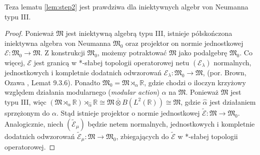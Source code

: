 \begin{Lemma}
Teza lematu \ref{lem:step2} jest prawdziwa dla iniektywnych algebr von Neumanna
typu III.
\end{Lemma}
\begin{proof}
Ponieważ $\mathfrak{M}$ jest iniektywną algebrą typu III,
istnieje półskończona iniektywna algebra von Neumanna
$\mathfrak{M}_{0}$ oraz projektor on normie jednostkowej
$\mathcal{E}: \mathfrak{M}_{0} \rightarrow \mathfrak{M}$.
Z konstrukcji $\mathfrak{M}_{0}$, możemy potraktować
$\mathfrak{M}$ jako podalgebrę $\mathfrak{M}_{0}$.
Co więcej, $\mathcal{E}$ jest granicą w *-słabej topologii operatorowej
netu $(\mathcal{E}_{\lambda})$ normalnych, jednostkowych i kompletnie dodatnich
odwzorowań $\mathcal{E}_{\lambda} : \mathfrak{M}_{0} \rightarrow \mathfrak{M}$,
(por. Brown, Ozawa \cite{Brown2008}, Lemat 9.3.6).
Ponadto
$\mathfrak{M}_{0} = \mathfrak{M} \rtimes_{\alpha} \mathbb{R}$,
gdzie chodzi o iloczyn krzyżowy względem działania modularnego
(\emph{modular action}) $\alpha$ na $\mathfrak{M}$.
Ponieważ $\mathfrak{M}$ jest typu III, więc
$(\mathfrak{M} \rtimes_{\alpha} \mathbb{R}) \rtimes_{\hat{\alpha}} \mathbb{R}
\cong \mathfrak{M} \bar{\otimes} B(L^{2}(\mathbb{R})) \cong \mathfrak{M}$,
gdzie $\hat{\alpha}$ jest działaniem sprzężonym do $\alpha$.
Stąd istnieje projektor o normie jednostkowej
$\tilde{\mathcal{E}} : \mathfrak{M} \rightarrow \mathfrak{M}_{0}$.
Analogicznie, niech $(\tilde{\mathcal{E}}_{\mu})$
będzie netem normalnych, jednostkowych i kompletnie dodatnich odwzorowań
$\tilde{\mathcal{E}}_{\mu}: \mathfrak{M} \rightarrow \mathfrak{M}_{0}$,
zbiegających do $\tilde{\mathcal{E}}$ w *-słabej topologii operatorowej.


\end{proof}
